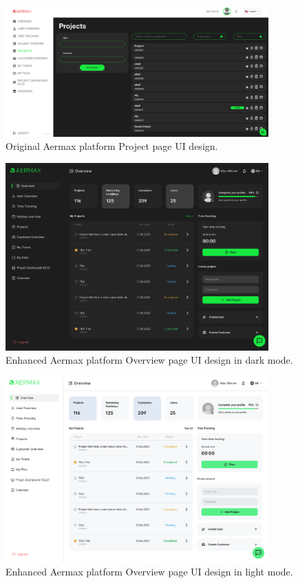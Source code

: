 \begin{figure}[H]
    \centering
    \includegraphics[width=0.9\textwidth]{src/assets/chapters/ProjectPage.png}
    \caption{Original Aermax platform Project page UI design.}
    \label{fig:project_page_design}
\end{figure}


\begin{figure}[H]
    \centering
    \includegraphics[width=0.9\textwidth]{src/assets/chapters/ui-ux-dashboard.png}
    \caption{Enhanced Aermax platform Overview page UI design in dark mode.}
    \label{fig:enhanced_overview_dark}
\end{figure}

\begin{figure}[H]
    \centering
    \includegraphics[width=0.9\textwidth]{src/assets/chapters/ui--ux-dashboard.png}
    \caption{Enhanced Aermax platform Overview page UI design in light mode.}
    \label{fig:enhanced_overview_light}
\end{figure}

